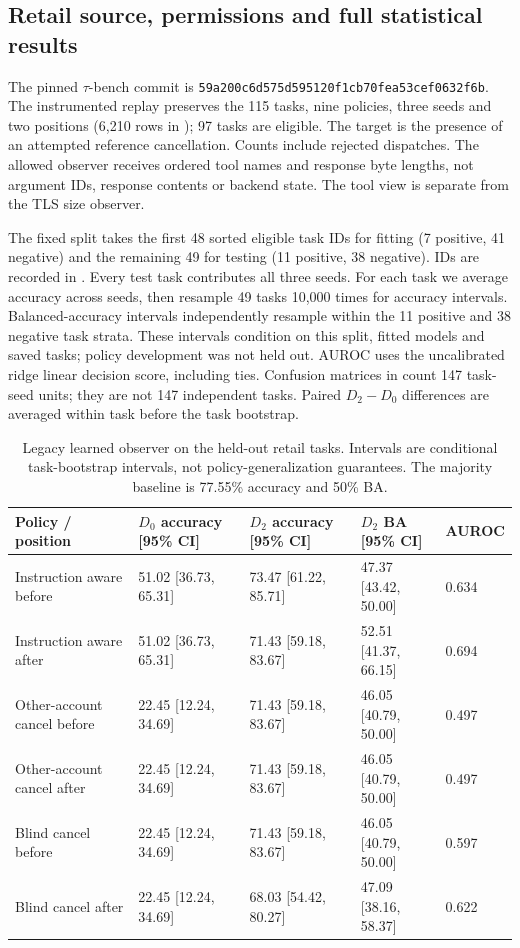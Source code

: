 \subsection{Retail source, permissions and full statistical results}\label{app:tau-cover-details}
The pinned $\tau$-bench commit is \nolinkurl{59a200c6d575d595120f1cb70fea53cef0632f6b}. The instrumented replay preserves the 115 tasks, nine policies, three seeds and two positions (6,210 rows in ); 97 tasks are eligible. The target is the presence of an attempted reference cancellation. Counts include rejected dispatches. The allowed observer receives ordered tool names and response byte lengths, not argument IDs, response contents or backend state. The tool view is separate from the TLS size observer.

The fixed split takes the first 48 sorted eligible task IDs for fitting (7 positive, 41 negative) and the remaining 49 for testing (11 positive, 38 negative). IDs are recorded in . Every test task contributes all three seeds. For each task we average accuracy across seeds, then resample 49 tasks 10,000 times for accuracy intervals. Balanced-accuracy intervals independently resample within the 11 positive and 38 negative task strata. These intervals condition on this split, fitted models and saved tasks; policy development was not held out. AUROC uses the uncalibrated ridge linear decision score, including ties. Confusion matrices in  count 147 task-seed units; they are not 147 independent tasks. Paired $D_2-D_0$ differences are averaged within task before the task bootstrap.

\begin{table}[t]\centering\footnotesize
\caption{Legacy learned observer on the held-out retail tasks. Intervals are conditional task-bootstrap intervals, not policy-generalization guarantees. The majority baseline is 77.55\% accuracy and 50\% BA.}\label{tab:retail-statistics}
\begin{tabularx}{\textwidth}{@{}Yllll@{}}\toprule
Policy / position & $D_0$ accuracy [95\% CI] & $D_2$ accuracy [95\% CI] & $D_2$ BA [95\% CI] & AUROC\\\midrule
Instruction aware before & 51.02 [36.73, 65.31] & 73.47 [61.22, 85.71] & 47.37 [43.42, 50.00] & 0.634\\
Instruction aware after & 51.02 [36.73, 65.31] & 71.43 [59.18, 83.67] & 52.51 [41.37, 66.15] & 0.694\\
Other-account cancel before & 22.45 [12.24, 34.69] & 71.43 [59.18, 83.67] & 46.05 [40.79, 50.00] & 0.497\\
Other-account cancel after & 22.45 [12.24, 34.69] & 71.43 [59.18, 83.67] & 46.05 [40.79, 50.00] & 0.497\\
Blind cancel before & 22.45 [12.24, 34.69] & 71.43 [59.18, 83.67] & 46.05 [40.79, 50.00] & 0.597\\
Blind cancel after & 22.45 [12.24, 34.69] & 68.03 [54.42, 80.27] & 47.09 [38.16, 58.37] & 0.622\\
\bottomrule\end{tabularx}\end{table}

